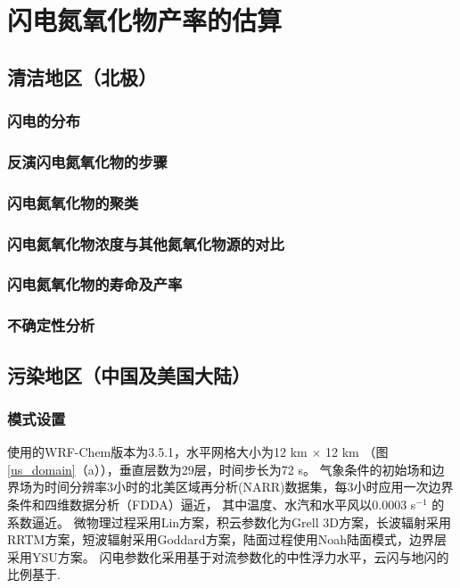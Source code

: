 
\chapter{闪电氮氧化物产率的估算} \label{chapter:PE}

\section{清洁地区（北极）}

\subsection{闪电的分布}
\subsection{反演闪电氮氧化物的步骤}
\subsection{闪电氮氧化物的聚类}
\subsection{闪电氮氧化物浓度与其他氮氧化物源的对比}
\subsection{闪电氮氧化物的寿命及产率}
\subsection{不确定性分析}


\section{污染地区（中国及美国大陆）}

\subsection{模式设置}

使用的WRF-Chem版本为3.5.1，水平网格大小为12 km $\times$ 12 km （图\ref{us_domain}（a）），垂直层数为29层，时间步长为72 s。
气象条件的初始场和边界场为时间分辨率3小时的北美区域再分析(NARR)数据集，每3小时应用一次边界条件和四维数据分析（FDDA）逼近，
其中温度、水汽和水平风以0.0003 s$^{-1}$ 的系数逼近\citep{Laughner.2017}。
微物理过程采用Lin方案\citep{Lin.1983}，积云参数化为Grell 3D方案\citep{Grell.1993a,Grell.2002a}，长波辐射采用RRTM方案\citep{Iacono.2008}，短波辐射采用Goddard方案，陆面过程使用Noah陆面模式\citep{Koren.1999}，边界层采用YSU方案\citep{Hong.2006}。
闪电参数化采用基于对流参数化的中性浮力水平\citep{Pickering.1992}，云闪与地闪的比例基于\citet{Boccippio.2001}.

